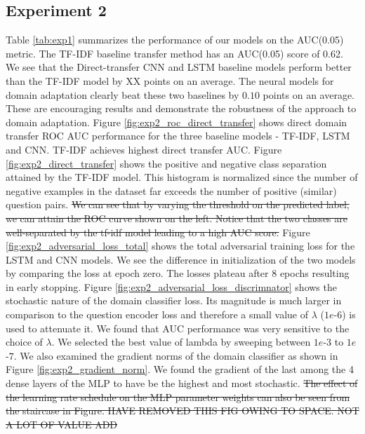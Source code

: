 \documentclass{sigkddExp}
\begin{document}
\subsection{Experiment 2}
Table \ref{tab:exp1} summarizes the performance of our models on the AUC(0.05) metric. The TF-IDF baseline transfer method has an AUC(0.05) score of 0.62. We see that the Direct-transfer CNN and LSTM baseline models perform better than the TF-IDF model by {\color{red}XX} points on an average. The neural models for domain adaptation clearly beat these two baselines by $0.10$ points on an average. These are encouraging results and demonstrate the robustness of the approach to domain adaptation.
Figure \ref{fig:exp2_roc_direct_transfer} shows direct domain transfer ROC AUC performance for the three baseline models - TF-IDF, LSTM and CNN. TF-IDF achieves highest direct transfer AUC. Figure \ref{fig:exp2_direct_transfer} shows the positive and negative class separation attained by the TF-IDF model. This histogram is normalized since the number of negative examples in the dataset far exceeds the number of positive (similar) question pairs. {\color{red}\st{We can see that by varying the threshold on the predicted label, we can attain the ROC curve shown on the left. Notice that the two classes are well-separated by the tf-idf model leading to a high AUC score.}}
Figure \ref{fig:exp2_adversarial_loss_total} shows the total adversarial training loss for the LSTM and CNN models. We see the difference in initialization of the two models by comparing the loss at epoch zero. The losses plateau after 8 epochs resulting in early stopping. Figure \ref{fig:exp2_adversarial_loss_discrimnator} shows the stochastic nature of the domain classifier loss. Its magnitude is much larger in comparison to the question encoder loss and therefore a small value of $\lambda$ ($1e$-$6$) is used to attenuate it. We found that AUC performance was very sensitive to the choice of $\lambda$. We selected the best value of lambda by sweeping between $1e$-$3$ to $1e$-$7$. We also examined the gradient norms of the domain classifier as shown in Figure \ref{fig:exp2_gradient_norm}. We found the gradient of the last among the 4 dense layers of the MLP to have be the highest and most stochastic. \st{The effect of the learning rate schedule on the MLP parameter weights can also be seen from the staircase in Figure. HAVE REMOVED THIS FIG OWING TO SPACE. NOT A LOT OF VALUE ADD}
\end{document}
